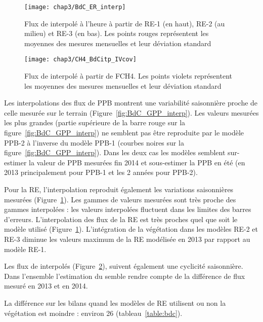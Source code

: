 \begin{figure}
\centering
\texttt{[image: chap3/BdC\_ER\_interp]}
\caption{Flux de \coo interpolé à l'heure à partir de RE-1 (en haut), RE-2 (au milieu) et RE-3 (en bas). Les points rouges représentent les moyennes des mesures mensuelles et leur déviation standard}
\label{fig:BdC_ER_interp}
\end{figure}

\begin{figure}
\centering
\texttt{[image: chap3/CH4\_BdCitp\_IVcov]}
\caption{Flux de \coo interpolé à partir de FCH4. Les points violets représentent les moyennes des mesures mensuelles et leur déviation standard}
\label{fig:BdC_CH4_interp}
\end{figure}



Les interpolations des flux de PPB montrent une variabilité saisonnière proche de celle mesurée sur le terrain (Figure~\ref{fig:BdC_GPP_interp}). 
Les valeurs mesurées les plus grandes (partie supérieure de la barre rouge sur la figure~\ref{fig:BdC_GPP_interp}) ne semblent pas être reproduite par le modèle PPB-2 à l'inverse du modèle PPB-1 (courbes noires sur la figure~\ref{fig:BdC_GPP_interp}).
Dans les deux cas les modèles semblent sur-estimer la valeur de PPB mesurées fin 2014 et sous-estimer la PPB en été (en 2013 principalement pour PPB-1 et les 2 années pour PPB-2).

Pour la RE, l'interpolation reproduit également les variations saisonnières mesurées (Figure~\ref{fig:BdC_ER_interp}).
Les gammes de valeurs mesurées sont très proche des gammes interpolées :
les valeurs interpolées fluctuent dans les limites des barres d'erreurs.
L'interpolation des flux de la RE est très proches quel que soit le modèle utilisé (Figure~\ref{fig:BdC_ER_interp}).
L'intégration de la végétation dans les modèles RE-2 et RE-3 diminue les valeurs maximum de la RE modélisée en 2013 par rapport au modèle RE-1.

Les flux de \chh interpolés (Figure~\ref{fig:BdC_CH4_interp}), suivent également une cyclicité saisonnière.
Dans l'ensemble l'estimation du \chh semble rendre compte de la différence de flux mesuré en 2013 et en 2014.



La différence sur les bilans quand les modèles de RE utilisent ou non la végétation est moindre : environ \SI{26}{\gcma} (tableau~\ref{table:bdc}).


